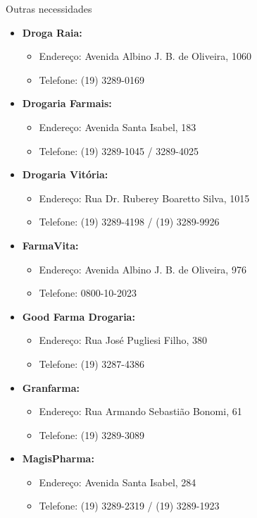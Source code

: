 \begin{story}{Outras necessidades}
\begin{itemize}
\item \textbf{Droga Raia:}
\begin{itemize}
\item Endereço: Avenida Albino J. B. de Oliveira, 1060
\item Telefone: (19) 3289-0169
\end{itemize}

\item \textbf{Drogaria Farmais:}
\begin{itemize}
\item Endereço: Avenida Santa Isabel, 183
\item Telefone: (19) 3289-1045 / 3289-4025
\end{itemize}

\item \textbf{Drogaria Vitória:}
\begin{itemize}
\item Endereço: Rua Dr. Ruberey Boaretto Silva, 1015
\item Telefone: (19) 3289-4198 / (19) 3289-9926
\end{itemize}

\item \textbf{FarmaVita:}
\begin{itemize}
\item Endereço: Avenida Albino J. B. de Oliveira, 976
\item Telefone: 0800-10-2023
\end{itemize}

\item \textbf{Good Farma Drogaria:}
\begin{itemize}
\item Endereço: Rua José Pugliesi Filho, 380
\item Telefone: (19) 3287-4386
\end{itemize}

\item \textbf{Granfarma:}
\begin{itemize}
\item Endereço: Rua Armando Sebastião Bonomi, 61
\item Telefone: (19) 3289-3089
\end{itemize}

\item \textbf{MagisPharma:}
\begin{itemize}
\item Endereço: Avenida Santa Isabel, 284
\item Telefone: (19) 3289-2319 / (19) 3289-1923
\end{itemize}


\end{itemize}
\end{story}
